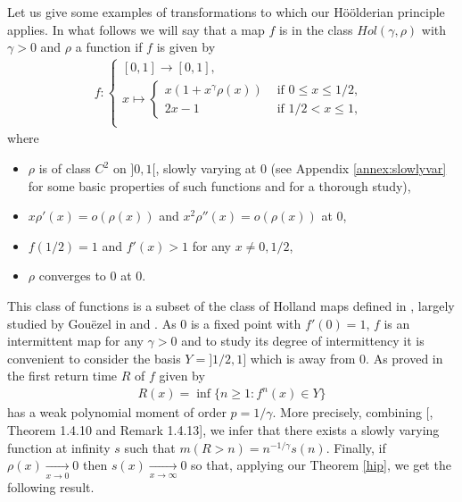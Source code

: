 \documentclass{ws-sd}
\begin{document}
Let us give some examples of transformations to which our H\"oölderian principle applies. In what follows we will say that a map $f$ is in the class $Hol(\gamma, \rho)$ with $\gamma > 0$ and $\rho$ a function if $f$ is given by
    \begin{align}
        \label{def:Holland_map}
    f :
    \left\{
          \begin{array}{ll}
            [0,1]  \longrightarrow  [0,1], \\
            x  \longmapsto
                \left\{
                \begin{array}{ll}
                      x(1+x^{\gamma}\rho(x))
                        &\text{ if } 0 \le x \le 1/2,
                  \\ 2x -1
                        &\text{ if } 1/2 < x \le 1,
                \end{array}
                \right.
            \\
          \end{array}
    \right.
    \end{align}
where
\begin{itemize}
    \item $\rho$ is of class $C^2$ on $]0,1[$, slowly varying at $0$ (see Appendix \ref{annex:slowlyvar} for some basic properties of such functions and \cite{1} for a thorough study),
    \item $x\rho'(x) = o(\rho(x))$ and $x^2\rho''(x) = o(\rho(x))$ at $0$,
    \item $f(1/2)= 1$ and $f'(x) > 1$  for any $x \neq 0, 1/2$,
    \item $\rho$ converges to $0$ at $0$.
\end{itemize}
This class of functions is a subset of the class of Holland maps defined in \cite{18}, largely studied by Gouëzel in \cite{13} and \cite{14}. As $0$ is a fixed point with $f'(0) = 1$, $f$ is an intermittent map for any $\gamma > 0$ and to study its degree of intermittency it is convenient to consider the basis  $Y = ]1/2,1]$ which is away from $0$. As proved in \cite{14} the first return time $R$ of $f$ given by
\begin{align*}
    R(x) = \inf\{n \ge 1 : f^n(x) \in Y\}
\end{align*}
has a weak polynomial moment of order $p = 1/ \gamma$. More precisely, combining [, Theorem 1.4.10 and Remark 1.4.13], we infer that there exists a slowly varying function at infinity $s$ such that $m(R > n) = n^{-1/\gamma}s(n)$. Finally, if $\rho(x) \xrightarrow[x \to 0]{} 0$ then $s(x) \xrightarrow[x \to \infty]{} 0$ so that, applying our Theorem \ref{hip}, we get the following result.
\end{document}
